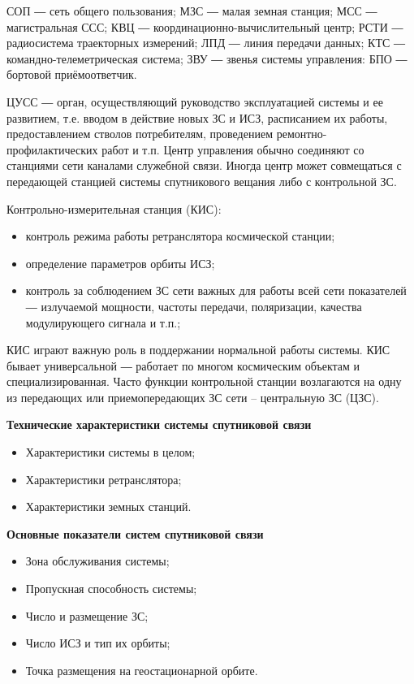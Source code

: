 \documentclass[14pt,a4paper,oneside]{extarticle}
\begin{document}
СОП ― сеть общего пользования; МЗС ― малая земная станция; МСС ― магистральная ССС; КВЦ ― координационно-вычислительный центр; РСТИ ― радиосистема траекторных измерений; ЛПД ― линия передачи данных; КТС ― командно-телеметрическая система; ЗВУ ― звенья системы управления: БПО ― бортовой приёмоответчик.

ЦУСС  ― орган, осуществляющий руководство эксплуатацией системы и ее развитием, т.е. вводом в действие новых ЗС и ИСЗ, расписанием их работы, предоставлением стволов потребителям, проведением ремонтно-профилактических работ и т.п. Центр управления обычно соединяют со станциями сети каналами служебной связи. Иногда центр может совмещаться с передающей станцией системы спутникового вещания либо с контрольной ЗС.

Контрольно-измерительная станция (КИС):
\begin{itemize}
    \item контроль режима работы ретранслятора космической станции;
    \item определение параметров орбиты ИСЗ;
    \item контроль за соблюдением ЗС сети важных для работы всей сети показателей ― излучаемой мощности, частоты передачи, поляризации, качества модулирующего сигнала и т.п.;
\end{itemize}

КИС играют важную роль в поддержании нормальной работы системы. КИС бывает универсальной ― работает по многом космическим объектам и специализированная. Часто функции контрольной станции возлагаются на одну из передающих или приемопередающих ЗС сети – центральную ЗС (ЦЗС).

\textbf{Технические характеристики системы спутниковой связи}
\begin{itemize}
    \item Характеристики системы в целом;
    \item Характеристики ретранслятора;
    \item Характеристики земных станций.

\end{itemize}

\textbf{Основные показатели систем спутниковой связи}

\begin{itemize}
    \item Зона обслуживания системы;
    \item Пропускная способность системы;
    \item Число и размещение ЗС;
    \item Число ИСЗ и тип их орбиты;
    \item Точка размещения на геостационарной орбите.
\end{itemize}
\end{document}

